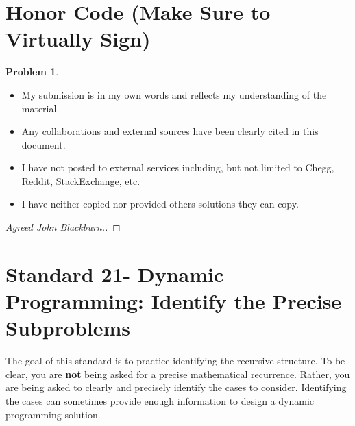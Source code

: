 \documentclass[11pt]{article}
\theoremstyle{definition}
\theoremstyle{definition}
\newtheorem{required}{Problem}
\theoremstyle{definition}
\begin{document}
\section{Honor Code (Make Sure to Virtually Sign)} \label{HonorCode}

\begin{required}
\begin{itemize}
\item My submission is in my own words and reflects my understanding of the material.
\item Any collaborations and external sources have been clearly cited in this document.
\item I have not posted to external services including, but not limited to Chegg, Reddit, StackExchange, etc.
\item I have neither copied nor provided others solutions they can copy.
\end{itemize}

\end{required}

\begin{proof}[Agreed John Blackburn.]
\end{proof}


\newpage
\section{Standard 21- Dynamic Programming: Identify the Precise Subproblems}

\noindent The goal of this standard is to practice identifying the recursive structure. To be clear, you are \textbf{not} being asked for a precise mathematical recurrence. Rather, you are being asked to clearly and precisely identify the cases to consider. Identifying the cases can sometimes provide enough information to design a dynamic programming solution.
\end{document}
